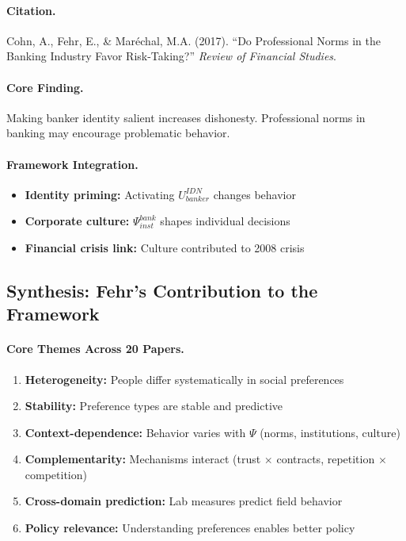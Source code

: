 \paragraph{Citation.}
Cohn, A., Fehr, E., \& Mar\'echal, M.A. (2017).
``Do Professional Norms in the Banking Industry Favor Risk-Taking?''
\emph{Review of Financial Studies}.

\paragraph{Core Finding.}
Making banker identity salient increases dishonesty. Professional norms
in banking may encourage problematic behavior.

\paragraph{Framework Integration.}
\begin{itemize}
  \item \textbf{Identity priming:} Activating $U^{IDN}_{banker}$ changes behavior
  \item \textbf{Corporate culture:} $\Psi_{inst}^{bank}$ shapes individual decisions
  \item \textbf{Financial crisis link:} Culture contributed to 2008 crisis
\end{itemize}

\subsection{Synthesis: Fehr's Contribution to the Framework}

\paragraph{Core Themes Across 20 Papers.}

\begin{enumerate}
  \item \textbf{Heterogeneity:} People differ systematically in social preferences
  \item \textbf{Stability:} Preference types are stable and predictive
  \item \textbf{Context-dependence:} Behavior varies with $\Psi$ (norms, institutions, culture)
  \item \textbf{Complementarity:} Mechanisms interact (trust $\times$ contracts, repetition $\times$ competition)
  \item \textbf{Cross-domain prediction:} Lab measures predict field behavior
  \item \textbf{Policy relevance:} Understanding preferences enables better policy
\end{enumerate}


